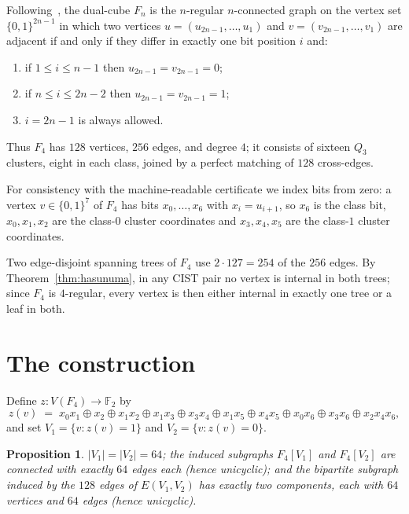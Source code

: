 \documentclass[11pt]{article}
\newtheorem{proposition}{Proposition}
\theoremstyle{remark}
\begin{document}
Following~\cite{Lalou2026}, the dual-cube $F_n$ is the $n$-regular
$n$-connected graph on the vertex set $\{0,1\}^{2n-1}$ in which two
vertices $u=(u_{2n-1},\dots,u_1)$ and $v=(v_{2n-1},\dots,v_1)$ are adjacent
if and only if they differ in exactly one bit position $i$ and:
\begin{enumerate}
\item if $1\le i\le n-1$ then $u_{2n-1}=v_{2n-1}=0$;
\item if $n\le i\le 2n-2$ then $u_{2n-1}=v_{2n-1}=1$;
\item $i=2n-1$ is always allowed.
\end{enumerate}
Thus $F_4$ has $128$ vertices, $256$ edges, and degree $4$; it consists of
sixteen $Q_3$ clusters, eight in each class, joined by a perfect matching
of $128$ cross-edges.

For consistency with the machine-readable certificate we index bits from
zero: a vertex $v\in\{0,1\}^7$ of $F_4$ has bits $x_0,\dots,x_6$ with
$x_i=u_{i+1}$, so $x_6$ is the class bit, $x_0,x_1,x_2$ are the class-$0$
cluster coordinates and $x_3,x_4,x_5$ are the class-$1$ cluster
coordinates.

Two edge-disjoint spanning trees of $F_4$ use $2\cdot 127=254$ of the $256$
edges. By Theorem~\ref{thm:hasunuma}, in any CIST pair no vertex is
internal in both trees; since $F_4$ is $4$-regular, every vertex is then
either internal in exactly one tree or a leaf in both.

\section{The construction}\label{sec:construction}

Define $z\colon V(F_4)\to\mathbb{F}_2$ by
\begin{equation}\label{eq:anf}
z(v) \;=\; x_0x_1 \oplus x_2 \oplus x_1x_2 \oplus x_1x_3 \oplus x_3x_4
\oplus x_1x_5 \oplus x_4x_5 \oplus x_0x_6 \oplus x_3x_6 \oplus x_2x_4x_6,
\end{equation}
and set $V_1=\{v : z(v)=1\}$ and $V_2=\{v : z(v)=0\}$.

\begin{proposition}\label{prop:partition}
$|V_1|=|V_2|=64$; the induced subgraphs $F_4[V_1]$ and $F_4[V_2]$ are
connected with exactly $64$ edges each (hence unicyclic); and the bipartite
subgraph induced by the $128$ edges of $E(V_1,V_2)$ has exactly two
components, each with $64$ vertices and $64$ edges (hence unicyclic).
\end{proposition}
\end{document}
